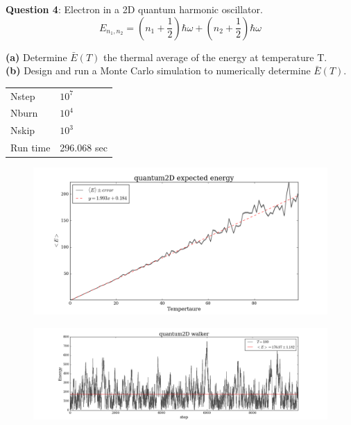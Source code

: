 \documentclass{article}
\begin{document}
\bigskip
\textbf{Question 4}: Electron in a 2D quantum harmonic oscillator. 
	\[E_{n_1, n_2} = \left(n_1 + \frac{1}{2} \right)\hbar\omega + \left(n_2 + \frac{1}{2} \right)\hbar\omega \]

\textbf{(a)} Determine $\bar{E}(T)$ the thermal average of the energy at temperature T. \\

\textbf{(b)} Design and run a Monte Carlo simulation to numerically determine $\bar{E}(T)$. \\

\begin{table}[H]
\centering
\begin{tabular}{|l|l|}
	\hline
	Nstep    & $10^7$ \\
	Nburn    & $10^4$ \\
	Nskip    & $10^3$ \\
	Run time &  296.068 sec \\
	\hline
\end{tabular}
\end{table}

\begin{figure}[H]
\begin{center}
\includegraphics[width=16cm]{../output/quantum2D/expected.png} 
\end{center}
\end{figure}

\begin{figure}[H]
\begin{center}
\includegraphics[width=16cm]{../output/quantum2D/walkers.png} 
\end{center}
\end{figure}
\end{document}

